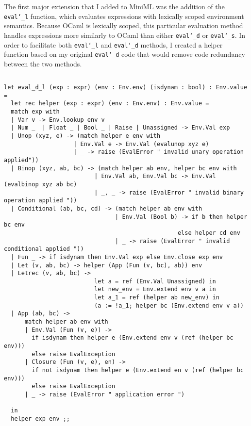 \documentclass{article}
\begin{document}
The first major extension that I added to MiniML was the addition of the \texttt{eval\char`_l} function, which evaluates expressions with lexically scoped environment semantics. Because OCaml is lexically scoped, this particular evaluation method handles expressions more similarly to OCaml than either \texttt{eval\char`_d} or \texttt{eval\char`_s}. In order to facilitate both \texttt{eval\char`_l} and \texttt{eval\char`_d} methods, I created a helper function based on my original \texttt{eval\char`_d} code that would remove code redundancy between the two methods. 
\begin{verbatim}

let eval_d_l (exp : expr) (env : Env.env) (isdynam : bool) : Env.value = 
  let rec helper (exp : expr) (env : Env.env) : Env.value =
  match exp with 
  | Var v -> Env.lookup env v 
  | Num _  | Float _ | Bool _ | Raise | Unassigned -> Env.Val exp
  | Unop (xyz, e) -> (match helper e env with 
                    | Env.Val e -> Env.Val (evalunop xyz e)
                    | _ -> raise (EvalError " invalid unary operation applied"))
  | Binop (xyz, ab, bc) -> (match helper ab env, helper bc env with 
                          | Env.Val ab, Env.Val bc -> Env.Val (evalbinop xyz ab bc) 
                          | _, _ -> raise (EvalError " invalid binary operation applied "))
  | Conditional (ab, bc, cd) -> (match helper ab env with 
                                | Env.Val (Bool b) -> if b then helper bc env 
                                                  else helper cd env 
                                | _ -> raise (EvalError " invalid conditional applied "))
  | Fun _ -> if isdynam then Env.Val exp else Env.close exp env
  | Let (v, ab, bc) -> helper (App (Fun (v, bc), ab)) env
  | Letrec (v, ab, bc) -> 
                          let a = ref (Env.Val Unassigned) in
                          let new_env = Env.extend env v a in
                          let a_1 = ref (helper ab new_env) in
                          (a := !a_1; helper bc (Env.extend env v a))
  | App (ab, bc) -> 
      match helper ab env with 
      | Env.Val (Fun (v, e)) -> 
        if isdynam then helper e (Env.extend env v (ref (helper bc env)))
        else raise EvalException
      | Closure (Fun (v, e), en) -> 
        if not isdynam then helper e (Env.extend en v (ref (helper bc env)))
        else raise EvalException
      | _ -> raise (EvalError " application error ")

  in 
  helper exp env ;;
\end{verbatim}
\end{document}
